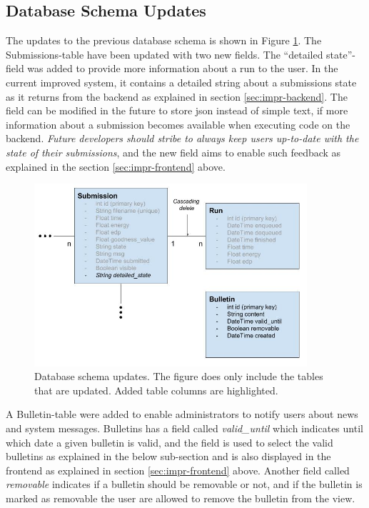 \subsection{Database Schema Updates}
\label{subsec:impr-database}
The updates to the previous database schema is shown in Figure \ref{fig:updated-database-schema}. The Submissions-table have been updated with two new fields. The ``detailed state''-field was added to provide more information about a run to the user. In the current improved system, it contains a detailed string about a submissions state as it returns from the backend as explained in section \ref{sec:impr-backend}. The field can be modified in the future to store \gls{json} instead of simple text, if more information about a submission becomes available when executing code on the backend. \textit{Future developers should stribe to always keep users up-to-date with the state of their submissions}, and the new field aims to enable such feedback as explained in the section \ref{sec:impr-frontend} above. \\

\begin{figure}
    \includegraphics[width=0.9\textwidth]{figs/updated_database_schema.jpg}
    \caption[Database schema updates]{Database schema updates. The figure does only include the tables that are updated. Added table columns are highlighted. }
    \label{fig:updated-database-schema}
\end{figure}

A Bulletin-table were added to enable administrators to notify users about news and system messages. Bulletins has a field called \textit{valid\_until} which indicates until which date a given bulletin is valid, and the field is used to select the valid bulletins as explained in the below sub-section and is also displayed in the frontend as explained in section \ref{sec:impr-frontend} above. Another field called \textit{removable} indicates if a bulletin should be removable or not, and if the bulletin is marked as removable the user are allowed to remove the bulletin from the view. \\

